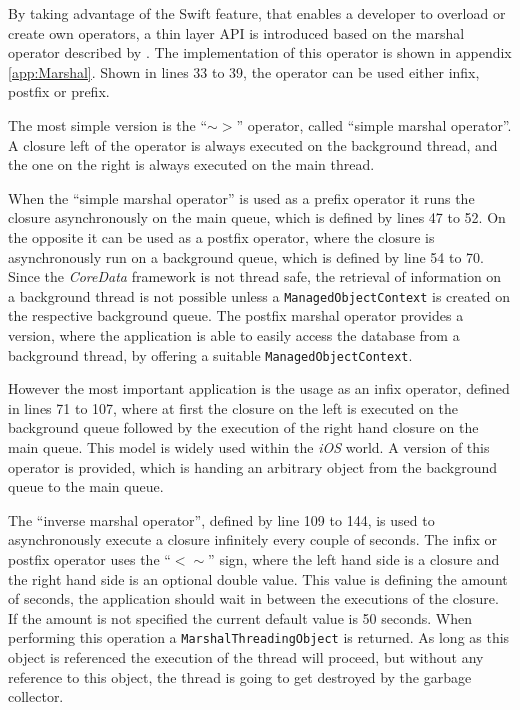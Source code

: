 By taking advantage of the \gls{Swift} feature, that enables a developer to overload or create own operators, a thin layer \gls{API} is introduced based on the marshal operator described by \cite{Smith:2014aa}. The implementation of this operator is shown in appendix \vref{app:Marshal}. Shown in lines 33 to 39, the operator can be used either infix, postfix or prefix.

The most simple version is the \enquote{$\sim>$} operator, called \enquote{simple marshal operator}. A closure left of the operator is always executed on the background thread, and the one on the right is always executed on the main thread. 

When the \enquote{simple marshal operator} is used as a prefix operator it runs the closure asynchronously on the main queue, which is defined by lines 47 to 52. On the opposite it can  be used as a postfix operator, where the closure is asynchronously run on a background queue, which is defined by line 54 to 70. Since the \emph{CoreData} framework is not thread safe, the retrieval of information on a background thread is not possible unless a \texttt{ManagedObjectContext} is created on the respective background queue. The postfix marshal operator provides a version, where the application is able to easily access the database from a background thread, by offering a suitable \texttt{ManagedObjectContext}.

However the most important application is the usage as an infix operator, defined in lines 71 to 107, where at first the closure on the left is executed on the background queue followed by the execution of the right hand closure on the main queue. This model is widely used within the \emph{iOS} world. A version of this operator is provided, which is handing an arbitrary object from the background queue to the main queue.

The \enquote{inverse marshal operator}, defined by line 109 to 144, is used to asynchronously execute a closure infinitely every couple of seconds. The infix or postfix operator uses the \enquote{$<\sim$} sign, where the left hand side is a closure and the right hand side is an optional double value. This value is defining the amount of seconds, the application should wait in between the executions of the closure. If the amount is not specified the current default value is 50 seconds. When performing this operation a \texttt{MarshalThreadingObject} is returned. As long as this object is referenced the execution of the thread will proceed, but without any reference to this object, the thread is going to get destroyed by the garbage collector.

